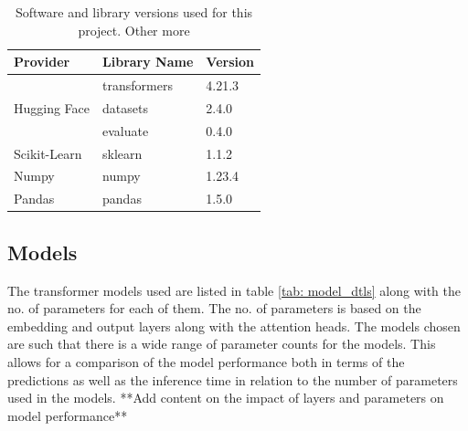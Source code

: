 \begin{table}[ht]
    \captionsetup{font=small}
    \centering
    \begin{tabularx}{\textwidth}{|X|X|X|}
        \hline
        \rowcolor[gray]{0.7}
        \multirow{-3}{*}{} \textbf{Provider} & \textbf{Library Name} & \textbf{Version} \\
        \hline
        \multirow{3}{*}{Hugging Face}        & transformers          & 4.21.3           \\
        \cline{2-3}
                                             & datasets              & 2.4.0            \\
        \cline{2-3}
                                             & evaluate              & 0.4.0            \\
        \hline
        Scikit-Learn                         & sklearn               & 1.1.2            \\
        \hline
        Numpy                                & numpy                 & 1.23.4           \\
        \hline
        Pandas                               & pandas                & 1.5.0            \\
        \hline
    \end{tabularx}
    \caption{Software and library versions used for this project. Other more }
    \label{tab: libs_used}
\end{table}

\subsection{Models}
The transformer models used are listed in table \ref{tab: model_dtls} along with the no. of parameters for each of them. The no. of parameters is based on the embedding and output layers along with the attention heads. The models chosen are such that there is a wide range of parameter counts for the models. This allows for a comparison of the model performance both in terms of the predictions as well as the inference time in relation to the number of parameters used in the models. **Add content on the impact of layers and parameters on model performance**


